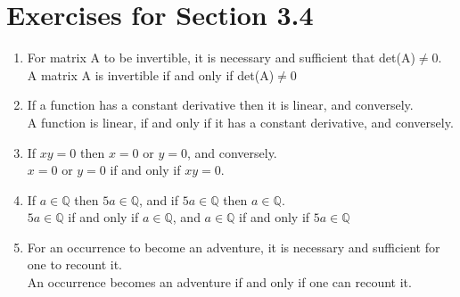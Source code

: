 \documentclass[12pt]{article}
\begin{document}
\section*{Exercises for Section 3.4}
\begin{enumerate}
	\item For matrix A to be invertible, it is necessary and sufficient that det(A)$\neq 0$.\\
	    A matrix A is invertible if and only if det(A)$\neq 0$
	\item If a function has a constant derivative then it is linear, and conversely.\\
	    A function is linear, if and only if it has a constant derivative, and conversely.
	\item If $xy=0$ then $x=0$ or $y=0$, and conversely.\\
	    $x=0$ or $y=0$ if and only if $xy=0$.
	\item If $a \in \mathbb{Q}$ then $5a\in\mathbb{Q}$, and if $5a\in\mathbb{Q}$ then $a\in\mathbb{Q}$.\\
	    $5a\in \mathbb{Q}$ if and only if $a\in \mathbb{Q}$, and $a\in\mathbb{ Q}$ if and only if $5a\in\mathbb{ Q}$
	\item For an occurrence to become an adventure, it is necessary and sufficient for one to recount it.\\
	    An occurrence becomes an adventure if and only if one can recount it.
\end{enumerate}
\end{document}
